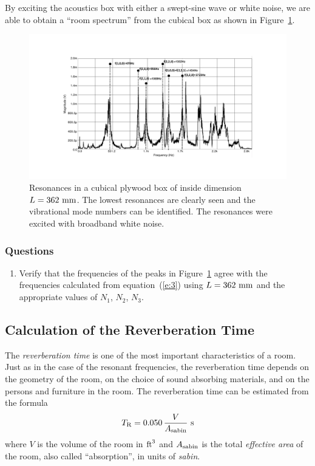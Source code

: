 \documentclass[11pt]{NSF}
\def\be{\begin{equation}}
\def\ee{\end{equation}}
\def\ben{\begin{enumerate}}
\def\een{\end{enumerate}}
\begin{document}
By exciting the acoustics box with either a swept-sine wave 
or white noise, we are able to obtain a ``room spectrum” from 
the cubical box as shown in Figure~\ref{f:2}. 
%
\begin{figure}[hbtp]
\begin{center}
\includegraphics[width=.9\textwidth]{fig8_2}
\caption{Resonances in a cubical plywood box of inside dimension 
$L = 362~{\rm mm}$. 
The lowest resonances are clearly seen and the vibrational mode
numbers can be identified.
The resonances were excited with broadband white noise.}
\label{f:2}
\end{center}
\end{figure}
%

\subsubsection*{Questions}
\ben
\item
Verify that the frequencies of the peaks in Figure~\ref{f:2} 
agree with the frequencies calculated from equation~(\ref{e:3}) using 
$L=362~{\rm mm}$ and the appropriate values of $N_1$, $N_2$, $N_3$.

\een

\subsection{Calculation of the Reverberation Time}

The {\em reverberation time} is one of the most important characteristics of
a room. Just as in the case of the resonant frequencies, the
reverberation time depends on the geometry of the room, on the choice of
sound absorbing materials, and on the persons and furniture in the room.
The reverberation time can be estimated from the formula 
%
\be
T_{\rm R} = 0.050\,\frac{V}{A_{\rm sabin}}~{\rm s}
\label{e:TR}
\ee
%
where $V$ is the volume of the room in ${\rm ft}^3$ and $A_{\rm
sabin}$ is the total {\em effective area} of the room, also called
``absorption”, in units of {\em sabin}. 
\end{document}
